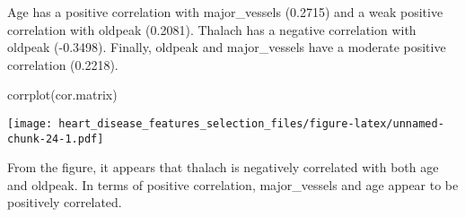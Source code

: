 \documentclass[
]{article}
\newenvironment{Shaded}{\begin{snugshade}}{\end{snugshade}}
\newcommand{\FunctionTok}[1]{\textcolor[rgb]{0.00,0.00,0.00}{#1}}
\newcommand{\NormalTok}[1]{#1}
\begin{document}
Age has a positive correlation with major\_vessels (0.2715) and a weak
positive correlation with oldpeak (0.2081). Thalach has a negative
correlation with oldpeak (-0.3498). Finally, oldpeak and major\_vessels
have a moderate positive correlation (0.2218).

\begin{Shaded}
\begin{Highlighting}[]
\FunctionTok{corrplot}\NormalTok{(cor.matrix)}
\end{Highlighting}
\end{Shaded}

\texttt{[image: heart\_disease\_features\_selection\_files/figure-latex/unnamed-chunk-24-1.pdf]}

From the figure, it appears that thalach is negatively correlated with
both age and oldpeak. In terms of positive correlation, major\_vessels
and age appear to be positively correlated.
\end{document}
